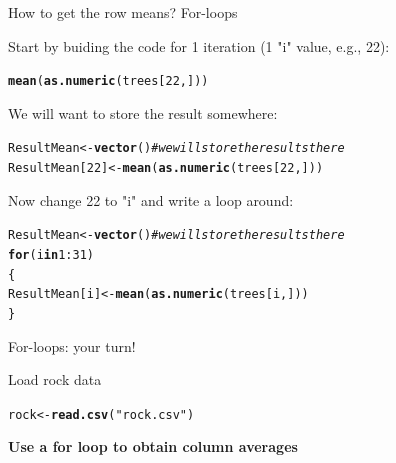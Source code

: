 \documentclass[10pt]{beamer}\usepackage[]{graphicx}\usepackage[]{color}
\makeatletter
\newcommand{\hlnum}[1]{\textcolor[rgb]{0.686,0.059,0.569}{#1}}%
\newcommand{\hlstr}[1]{\textcolor[rgb]{0.192,0.494,0.8}{#1}}%
\newcommand{\hlcom}[1]{\textcolor[rgb]{0.678,0.584,0.686}{\textit{#1}}}%
\newcommand{\hlopt}[1]{\textcolor[rgb]{0,0,0}{#1}}%
\newcommand{\hlstd}[1]{\textcolor[rgb]{0.345,0.345,0.345}{#1}}%
\newcommand{\hlkwa}[1]{\textcolor[rgb]{0.161,0.373,0.58}{\textbf{#1}}}%
\newcommand{\hlkwb}[1]{\textcolor[rgb]{0.69,0.353,0.396}{#1}}%
\newcommand{\hlkwd}[1]{\textcolor[rgb]{0.737,0.353,0.396}{\textbf{#1}}}%
\newenvironment{kframe}{%
 \def\at@end@of@kframe{}%
 \ifinner\ifhmode%
  \def\at@end@of@kframe{\end{minipage}}%
  \begin{minipage}{\columnwidth}%
 \fi\fi%
 \def\FrameCommand##1{\hskip\@totalleftmargin \hskip-\fboxsep
 \colorbox{shadecolor}{##1}\hskip-\fboxsep
     \hskip-\linewidth \hskip-\@totalleftmargin \hskip\columnwidth}%
 \MakeFramed {\advance\hsize-\width
   \@totalleftmargin\z@ \linewidth\hsize
   \@setminipage}}%
 {\par\unskip\endMakeFramed%
 \at@end@of@kframe}
\newenvironment{knitrout}{}{} %
\makeatother
\begin{document}
\begin{frame}[fragile]{How to get the row means? For-loops}

Start by buiding the code for 1 iteration (1 "i" value, e.g., 22):

\begin{knitrout}
\color{fgcolor}\begin{kframe}
\begin{alltt}
\hlkwd{mean}\hlstd{(}\hlkwd{as.numeric}\hlstd{(trees[}\hlnum{22}\hlstd{,]))}
\end{alltt}
\end{kframe}
\end{knitrout}

\pause 
We will want to store the result somewhere:
  
\begin{knitrout}
\color{fgcolor}\begin{kframe}
\begin{alltt}
  \hlstd{ResultMean} \hlkwb{<-} \hlkwd{vector}\hlstd{()} \hlcom{# we will store the results there}
  \hlstd{ResultMean[}\hlnum{22}\hlstd{]} \hlkwb{<-} \hlkwd{mean}\hlstd{(}\hlkwd{as.numeric}\hlstd{(trees[}\hlnum{22}\hlstd{,]))}
\end{alltt}
\end{kframe}
\end{knitrout}
  
  \pause
  
Now change 22 to "i" and write a loop around:
\begin{knitrout}
\color{fgcolor}\begin{kframe}
\begin{alltt}
\hlstd{ResultMean} \hlkwb{<-} \hlkwd{vector}\hlstd{()} \hlcom{# we will store the results there}
\hlkwa{for} \hlstd{(i} \hlkwa{in} \hlnum{1}\hlopt{:}\hlnum{31}\hlstd{)}
\hlstd{\{}
  \hlstd{ResultMean[i]} \hlkwb{<-} \hlkwd{mean}\hlstd{(}\hlkwd{as.numeric}\hlstd{(trees[i,]))}
\hlstd{\}}
\end{alltt}
\end{kframe}
\end{knitrout}

\end{frame}

\begin{frame}[fragile]{For-loops: your turn!}

Load rock data
\begin{knitrout}
\color{fgcolor}\begin{kframe}
\begin{alltt}
\hlstd{rock} \hlkwb{<-} \hlkwd{read.csv}\hlstd{(}\hlstr{"rock.csv"}\hlstd{)}
\end{alltt}
\end{kframe}
\end{knitrout}

  \centering
\textbf{\large Use a for loop to obtain column averages}

\end{frame}
\end{document}
